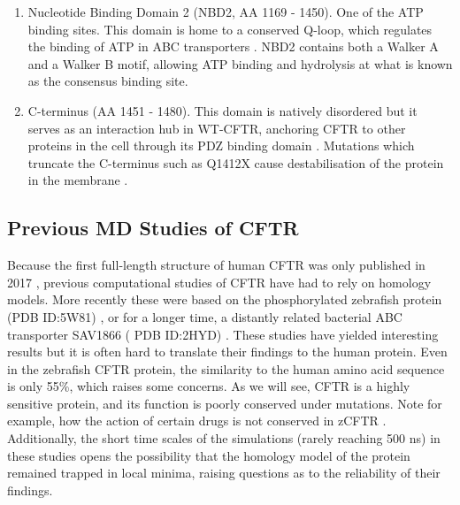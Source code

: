 \begin{enumerate}
	\item Nucleotide Binding Domain 2 (NBD2, AA 1169 - 1450). One of the ATP binding sites. This domain is home to a conserved Q-loop, which regulates the binding of ATP in ABC transporters \cite{ivey2020, zolnerciks2014, dong2015}. NBD2 contains both a Walker A and a Walker B motif, allowing ATP binding and hydrolysis at what is known as the consensus binding site. 
\item C-terminus (AA 1451 - 1480). This domain is natively disordered but it serves as an interaction hub in WT-CFTR, anchoring CFTR to other proteins in the cell through its PDZ binding domain \cite{moyer1999, cushing2008}. Mutations which truncate the C-terminus such as Q1412X cause destabilisation of the protein in the membrane \cite{yeh2019a}.

\end{enumerate}



\subsection {Previous MD Studies of CFTR}
Because the first full-length structure of human CFTR was only published in 2017 \cite{liu2017}, previous computational studies of CFTR have had to rely on homology models. More recently these were based on the phosphorylated zebrafish protein (PDB ID:5W81) \cite{zhang2017a}, or for a longer time, a distantly related bacterial ABC transporter SAV1866 ( PDB ID:2HYD) \cite{dawson2006, hoffmann2018, norimatsu2012}. These studies have yielded interesting results but it is often hard to translate their findings to the human protein. Even in the zebrafish CFTR protein, the similarity to the human amino acid sequence is only 55\%, which raises some concerns. As we will see, CFTR is a highly sensitive protein, and its function is poorly conserved under mutations. Note for example, how the action of certain drugs is not conserved in zCFTR \cite{laselva2019}. Additionally, the short time scales of the simulations (rarely reaching 500 ns) in these studies opens the possibility that the homology model of the protein remained trapped in local minima, raising questions as to the reliability of their findings.  

